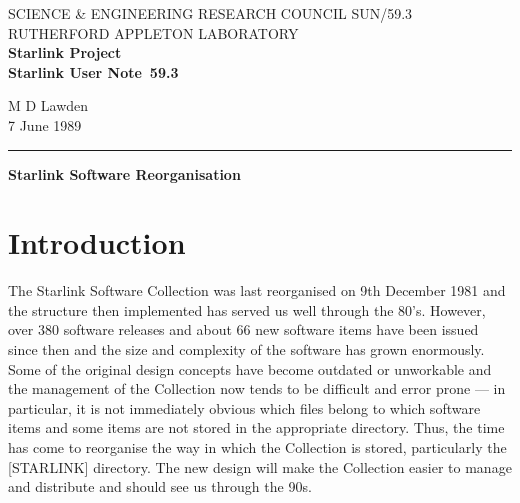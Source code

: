 \pagestyle{myheadings}

\newcommand{\stardoccategory}  {Starlink User Note}
\newcommand{\stardocinitials}  {SUN}
\newcommand{\stardocnumber}    {59.3}
\newcommand{\stardocauthors}   {M D Lawden}
\newcommand{\stardocdate}      {7 June 1989}
\newcommand{\stardoctitle}     {Starlink Software Reorganisation}

\newcommand{\stardocname}{\stardocinitials /\stardocnumber}
\markright{\stardocname}
\setlength{\textwidth}{160mm}
\setlength{\textheight}{240mm}
\setlength{\topmargin}{-5mm}
\setlength{\oddsidemargin}{0mm}
\setlength{\evensidemargin}{0mm}
\setlength{\parindent}{0mm}
\setlength{\parskip}{\medskipamount}
\setlength{\unitlength}{1mm}


\thispagestyle{empty}
SCIENCE \& ENGINEERING RESEARCH COUNCIL \hfill \stardocname\\
RUTHERFORD APPLETON LABORATORY\\
{\large\bf Starlink Project\\}
{\large\bf \stardoccategory\ \stardocnumber}
\begin{flushright}
\stardocauthors\\
\stardocdate
\end{flushright}
\vspace{-4mm}
\rule{\textwidth}{0.5mm}
\vspace{5mm}
\begin{center}
{\Large\bf \stardoctitle}
\end{center}
\vspace{5mm}

\section{Introduction}

The Starlink Software Collection was last reorganised on 9th December 1981 and
the structure then implemented has served us well through the 80's.
However, over 380 software releases and about 66 new software items have been
issued since then and the size and complexity of the software has grown
enormously.
Some of the original design concepts have become outdated or unworkable and the
management of the Collection now tends to be difficult and error prone --- in
particular, it is not immediately obvious which files belong to which
software items and some items are not stored in the appropriate directory.
Thus, the time has come to reorganise the way in which the Collection is stored,
particularly the \mbox{[STARLINK]} directory.
The new design will make the Collection easier to manage and distribute and
should see us through the 90s.

